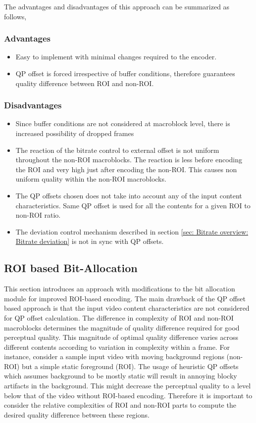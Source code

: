\documentclass[11pt]{article} %
\begin{document}
The advantages and disadvantages of this approach can be summarized as follows,
\subsubsection*{Advantages}
\begin{itemize}
	\item Easy to implement with minimal changes required to the encoder.
	\item QP offset is forced irrespective of buffer conditions, therefore guarantees quality difference between ROI and non-ROI.
\end{itemize}

\subsubsection*{Disadvantages}
\begin{itemize}
	\item Since buffer conditions are not considered at macroblock level, there is increased possibility of dropped frames
	\item The reaction of the bitrate control to external offset is not uniform throughout the non-ROI macroblocks. The reaction is less before encoding the ROI and very high just after encoding the non-ROI. This causes non uniform quality within the non-ROI macroblocks. 
	\item The QP offsets chosen does not take into account any of the input content characteristics. Same QP offset is used for all the contents for a given ROI to non-ROI ratio.
	\item The deviation control mechanism described in section \ref{sec: Bitrate overview: Bitrate deviation} is not in sync with QP offsets. 
\end{itemize}


\subsection{ROI based Bit-Allocation}
This section introduces an approach with modifications to the bit allocation module for improved ROI-based encoding. The main drawback of the QP offset based approach is that the input video content characteristics are not considered for QP offset calculation. The difference in complexity of ROI and non-ROI macroblocks determines the magnitude of quality difference required for good perceptual quality. This magnitude of optimal quality difference varies across different contents according to variation in complexity within a frame. For instance, consider a sample input video with moving background regions (non-ROI) but a simple static foreground (ROI). The usage of heuristic QP offsets which assumes background to be mostly static will result in annoying blocky artifacts in the background. This might decrease the perceptual quality to a level below that of the video without ROI-based encoding. Therefore it is important to consider the relative complexities of ROI and non-ROI parts to compute the desired quality difference between these regions.
\end{document}
